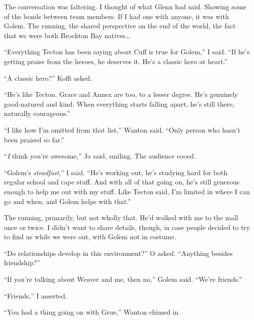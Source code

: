 The conversation was faltering.  I thought of what Glenn had said.  Showing some of the bonds between team members.  If I had one with anyone, it was with Golem.  The running, the shared perspective on the end of the world, the fact that we were both Brockton Bay natives\ldots



``Everything Tecton has been saying about Cuff is true for Golem,'' I said.  ``If he's getting praise from the heroes, he deserves it.  He's a classic hero at heart.''



``A classic hero?'' Koffi asked.



``He's like Tecton.  Grace and Annex are too, to a lesser degree.  He's genuinely good-natured and kind.  When everything starts falling apart, he's still there, naturally courageous.''



``I like how I'm omitted from that list,'' Wanton said.  ``Only person who hasn't been praised so far.''



``\emph{I} think you're awesome,'' Jo said, smiling.  The audience cooed.



``Golem's \emph{steadfast},'' I said.  ``He's working out, he's studying hard for both regular school and cape stuff.  And with all of that going on, he's still generous enough to help me out with my stuff.  Like Tecton said, I'm limited in where I can go and when, and Golem helps with that.''



The running, primarily, but not wholly that.  He'd walked with me to the mall once or twice.  I didn't want to share details, though, in case people decided to try to find us while we were out, with Golem not in costume.



``Do relationships develop in this environment?'' O asked.  ``Anything besides friendship?''



``If you're talking about Weaver and me, then no,'' Golem said.  ``We're friends.''



``Friends,'' I asserted.



``You had a thing going on with Grue,'' Wanton chimed in.



